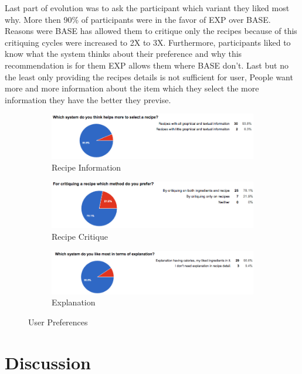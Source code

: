 Last part of evolution was to ask the participant which variant they liked most why. More then 90\% of participants were in the favor of EXP over BASE. Reasons were BASE has allowed them to critique only the recipes because of this critiquing cycles were increased to 2X to 3X. Furthermore, participants liked to know what the system thinks about their preference and why this recommendation is for them EXP allows them where BASE don’t. Last but no the least only providing the recipes details is not sufficient for user, People want more and more information about the item which they select the more information they have the better they previse. 

	  \begin{figure}[h]
	  	\centering
	  	\begin{subfigure}{.80\textwidth}
	  		\includegraphics[width=.9\linewidth]{figures/ch5_stat_user_preference_recipe_info}
	  		\caption{Recipe Information}
	  	\end{subfigure}
	  	\begin{subfigure}{.80\textwidth}
	  		\includegraphics[width=.9\linewidth]{figures/ch5_stat_user_preference_recipe_critique}
	  		\caption{Recipe Critique}
	  	\end{subfigure}
	  	\begin{subfigure}{.80\textwidth}
	  		\includegraphics[width=.9\linewidth]{figures/ch5_stat_user_preference_recipe_explanation}
	  		\caption{Explanation}
	  	\end{subfigure}
	  	\caption{User Preferences}
	  	\label{fig:ch5_stat_user_preference}
	  \end{figure}
	  
\section{Discussion}

